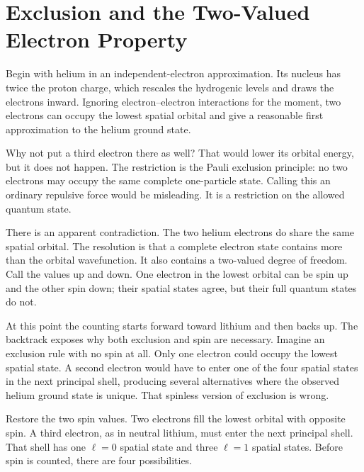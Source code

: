 \section{Exclusion and the Two-Valued Electron Property}

Begin with helium in an independent-electron approximation. Its nucleus has twice the proton charge, which rescales the hydrogenic levels and draws the electrons inward. Ignoring electron--electron interactions for the moment, two electrons can occupy the lowest spatial orbital and give a reasonable first approximation to the helium ground state.

Why not put a third electron there as well? That would lower its orbital energy, but it does not happen. The restriction is the Pauli exclusion principle: no two electrons may occupy the same complete one-particle state. Calling this an ordinary repulsive force would be misleading. It is a restriction on the allowed quantum state.

There is an apparent contradiction. The two helium electrons do share the same spatial orbital. The resolution is that a complete electron state contains more than the orbital wavefunction. It also contains a two-valued degree of freedom. Call the values up and down. One electron in the lowest orbital can be spin up and the other spin down; their spatial states agree, but their full quantum states do not.

At this point the counting starts forward toward lithium and then backs up. The backtrack exposes why both exclusion and spin are necessary. Imagine an exclusion rule with no spin at all. Only one electron could occupy the lowest spatial state. A second electron would have to enter one of the four spatial states in the next principal shell, producing several alternatives where the observed helium ground state is unique. That spinless version of exclusion is wrong.

Restore the two spin values. Two electrons fill the lowest orbital with opposite spin. A third electron, as in neutral lithium, must enter the next principal shell. That shell has one \(\ell=0\) spatial state and three \(\ell=1\) spatial states. Before spin is counted, there are four possibilities.

\begin{classroomqa}
\end{classroomqa}

